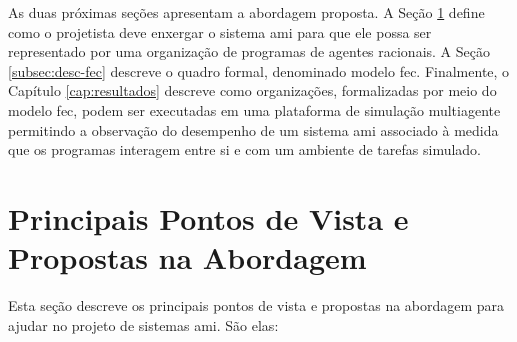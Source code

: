     As duas próximas seções apresentam a abordagem proposta. A Seção \ref{sec:pontos-propostas} define como o projetista deve enxergar o sistema \acrshort{ami} para que ele possa ser representado por uma organização de programas de agentes racionais. A Seção \ref{subsec:desc-fec} descreve o quadro formal, denominado modelo \acrshort{fec}. Finalmente, o Capítulo \ref{cap:resultados} descreve como organizações, formalizadas por meio do modelo \acrshort{fec}, podem ser executadas em uma plataforma de simulação multiagente permitindo a observação do desempenho de um sistema \acrshort{ami} associado à medida que os programas interagem entre si e com um ambiente de tarefas simulado.
    
\section{Principais Pontos de Vista e Propostas na Abordagem}
\label{sec:pontos-propostas}

Esta seção descreve os principais pontos de vista e propostas na abordagem para ajudar no projeto de sistemas \acrshort{ami}. São elas: 

